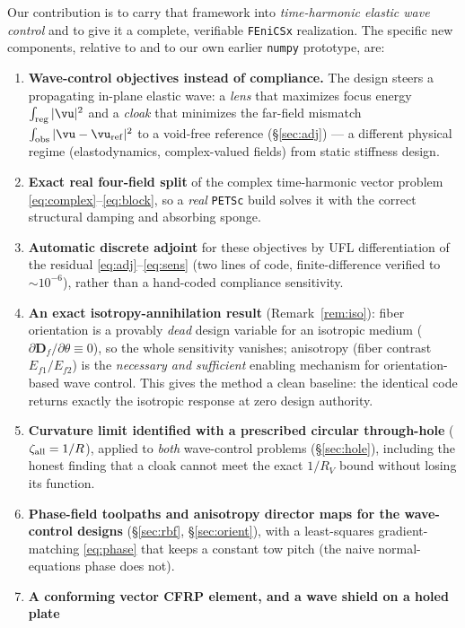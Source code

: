 \documentclass[11pt]{article}
\begin{document}
Our contribution is to carry that framework into \emph{time-harmonic elastic wave
control} and to give it a complete, verifiable \texttt{FEniCSx} realization. The
specific new components, relative to \cite{wong2025} and to our own earlier
\texttt{numpy} prototype, are:
\begin{enumerate}\itemsep2pt
\item \textbf{Wave-control objectives instead of compliance.} The design steers a
propagating in-plane elastic wave: a \emph{lens} that maximizes focus energy
$\int_{\rm reg}|\vu|^2$ and a \emph{cloak} that minimizes the far-field mismatch
$\int_{\rm obs}|\vu-\vu_{\rm ref}|^2$ to a void-free reference
(\S\ref{sec:adj}) --- a different physical regime (elastodynamics, complex-valued
fields) from static stiffness design.
\item \textbf{Exact real four-field split} of the complex time-harmonic vector
problem \eqref{eq:complex}--\eqref{eq:block}, so a \emph{real} \texttt{PETSc}
build solves it with the correct structural damping and absorbing sponge.
\item \textbf{Automatic discrete adjoint} for these objectives by UFL
differentiation of the residual \eqref{eq:adj}--\eqref{eq:sens} (two lines of
code, finite-difference verified to $\sim\!10^{-6}$), rather than a hand-coded
compliance sensitivity.
\item \textbf{An exact isotropy-annihilation result} (Remark~\ref{rem:iso}):
fiber orientation is a provably \emph{dead} design variable for an isotropic
medium ($\partial\mathbf D_f/\partial\theta\equiv0$), so the whole sensitivity
vanishes; anisotropy (fiber contrast $E_{f1}/E_{f2}$) is the \emph{necessary and
sufficient} enabling mechanism for orientation-based wave control. This gives the
method a clean baseline: the identical code returns exactly the isotropic response
at zero design authority.
\item \textbf{Curvature limit identified with a prescribed circular through-hole}
($\zeta_{\rm all}=1/R$), applied to \emph{both} wave-control problems
(\S\ref{sec:hole}), including the honest finding that a cloak cannot meet the exact
$1/R_V$ bound without losing its function.
\item \textbf{Phase-field toolpaths and anisotropy director maps for the
wave-control designs} (\S\ref{sec:rbf}, \S\ref{sec:orient}), with a
least-squares gradient-matching \eqref{eq:phase} that keeps a constant tow pitch
(the naive normal-equations phase does not).
\item \textbf{A conforming vector CFRP element, and a wave shield on a holed plate}

\end{enumerate}
\end{document}
